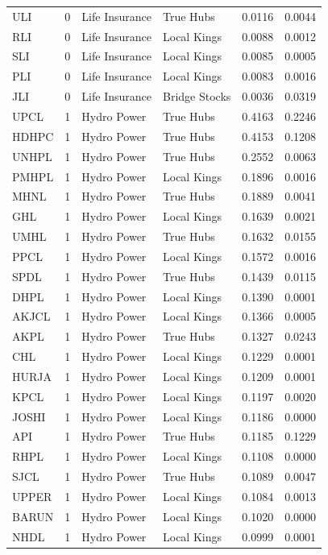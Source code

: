 \begin{longtable}{l r l l r r}
\bottomrule
\endlastfoot
ULI & 0 & Life Insurance & True Hubs & 0.0116 & 0.0044 \\
RLI & 0 & Life Insurance & Local Kings & 0.0088 & 0.0012 \\
SLI & 0 & Life Insurance & Local Kings & 0.0085 & 0.0005 \\
PLI & 0 & Life Insurance & Local Kings & 0.0083 & 0.0016 \\
JLI & 0 & Life Insurance & Bridge Stocks & 0.0036 & 0.0319 \\
UPCL & 1 & Hydro Power & True Hubs & 0.4163 & 0.2246 \\
HDHPC & 1 & Hydro Power & True Hubs & 0.4153 & 0.1208 \\
UNHPL & 1 & Hydro Power & True Hubs & 0.2552 & 0.0063 \\
PMHPL & 1 & Hydro Power & Local Kings & 0.1896 & 0.0016 \\
MHNL & 1 & Hydro Power & True Hubs & 0.1889 & 0.0041 \\
GHL & 1 & Hydro Power & Local Kings & 0.1639 & 0.0021 \\
UMHL & 1 & Hydro Power & True Hubs & 0.1632 & 0.0155 \\
PPCL & 1 & Hydro Power & Local Kings & 0.1572 & 0.0016 \\
SPDL & 1 & Hydro Power & True Hubs & 0.1439 & 0.0115 \\
DHPL & 1 & Hydro Power & Local Kings & 0.1390 & 0.0001 \\
AKJCL & 1 & Hydro Power & Local Kings & 0.1366 & 0.0005 \\
AKPL & 1 & Hydro Power & True Hubs & 0.1327 & 0.0243 \\
CHL & 1 & Hydro Power & Local Kings & 0.1229 & 0.0001 \\
HURJA & 1 & Hydro Power & Local Kings & 0.1209 & 0.0001 \\
KPCL & 1 & Hydro Power & Local Kings & 0.1197 & 0.0020 \\
JOSHI & 1 & Hydro Power & Local Kings & 0.1186 & 0.0000 \\
API & 1 & Hydro Power & True Hubs & 0.1185 & 0.1229 \\
RHPL & 1 & Hydro Power & Local Kings & 0.1108 & 0.0000 \\
SJCL & 1 & Hydro Power & True Hubs & 0.1089 & 0.0047 \\
UPPER & 1 & Hydro Power & Local Kings & 0.1084 & 0.0013 \\
BARUN & 1 & Hydro Power & Local Kings & 0.1020 & 0.0000 \\
NHDL & 1 & Hydro Power & Local Kings & 0.0999 & 0.0001 \\

\end{longtable}
